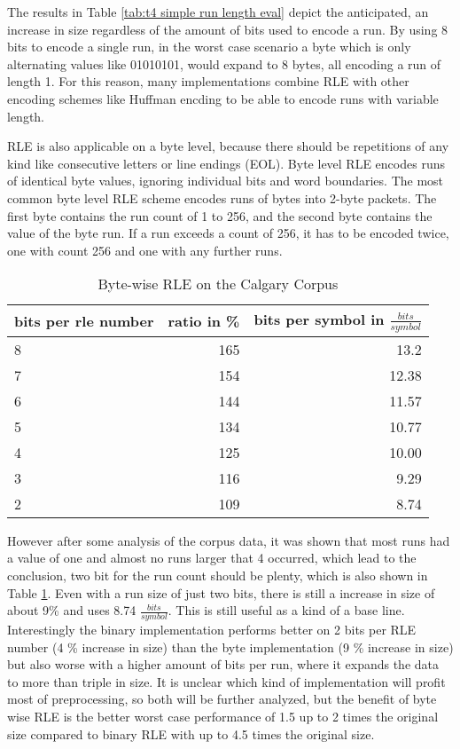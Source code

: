 \par{
The results in Table \ref{tab:t4 simple run length eval} depict the anticipated, an increase in size regardless of the amount of bits used to encode a run. By using 8 bits to encode a single run, in the worst case scenario a byte which is only alternating values like 01010101, would expand to 8 bytes, all encoding a run of length 1. For this reason, many implementations combine RLE with other encoding schemes like Huffman encding to be able to encode runs with variable length.
}

\par{
RLE is also applicable on a byte level, because there should be repetitions of any kind like consecutive letters or line endings (EOL). Byte level RLE encodes runs of identical byte values, ignoring individual bits and word boundaries. The most common byte level RLE scheme encodes runs of bytes into 2-byte packets. The first byte contains the run count of 1 to 256, and the second byte contains the value of the byte run. If a run exceeds a count of 256, it has to be encoded twice, one with count 256 and one with any further runs.
}

\begin{table}[h]
	\centering
	\begin{tabular}{l|r|r}
		\label{tab:t5 run length eval}
		
		bits per rle number &  ratio in \% & bits per symbol in $\frac{bits}{symbol}$\\
		\hline
		8 & 165 & 13.2 \\
		7 & 154 & 12.38\\
		6 & 144 & 11.57 \\
		5 & 134 & 10.77\\
		4 & 125 & 10.00\\
		3 & 116 & 9.29\\
		2 & 109 & 8.74 \\
	\end{tabular}
	\caption{Byte-wise RLE on the Calgary Corpus}
\end{table}


\par{
 However after some analysis of the corpus data, it was shown that most runs had a value of one and almost no runs larger that 4 occurred, which lead to the conclusion, two bit for the run count should be plenty, which is also shown in Table \ref{tab:t5 run length eval}.
 Even with a run size of just two bits, there is still a increase in size of about 9\% and uses 8.74 $\frac{bits}{symbol}$. This is still useful as a kind of a base line.
Interestingly the binary implementation performs better on 2 bits per RLE number (4 \% increase in size) than the byte implementation (9 \% increase in size) but also worse with a higher amount of bits per run, where it expands the data to more than triple in size. It is unclear which kind of implementation will profit most of preprocessing, so both will be further analyzed, but the benefit of byte wise RLE is the better worst case performance of 1.5 up to 2 times the original size compared to binary RLE with up to 4.5 times the original size.
}

